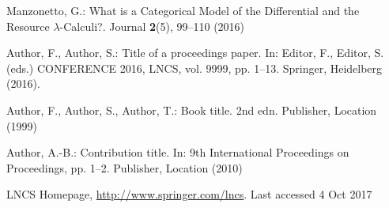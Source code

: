 \documentclass[runningheads]{llncs}
\begin{document}
%
%
%
%
%
%
% 
% 
%
\begin{thebibliography}{8}
Manzonetto, G.: What is a Categorical Model of the Differential and the Resource $\lambda$-Calculi?. Journal \textbf{2}(5), 99--110 (2016)

Author, F., Author, S.: Title of a proceedings paper. In: Editor,
F., Editor, S. (eds.) CONFERENCE 2016, LNCS, vol. 9999, pp. 1--13.
Springer, Heidelberg (2016). 

Author, F., Author, S., Author, T.: Book title. 2nd edn. Publisher,
Location (1999)

Author, A.-B.: Contribution title. In: 9th International Proceedings
on Proceedings, pp. 1--2. Publisher, Location (2010)

LNCS Homepage, \url{http://www.springer.com/lncs}. Last accessed 4
Oct 2017
\end{thebibliography}
\end{document}
